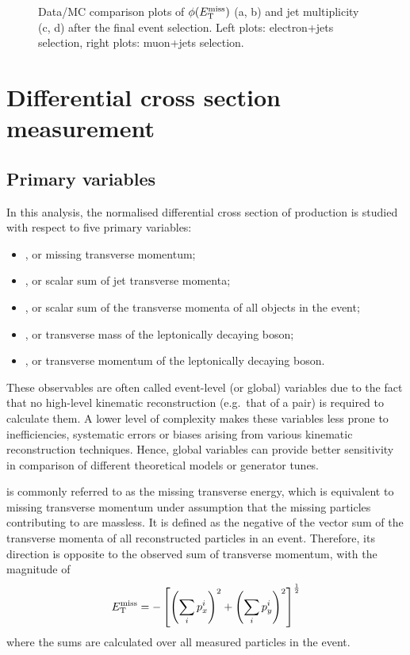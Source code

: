 \begin{figure}[hbtp]
\begin{center}
    \caption{Data/MC comparison plots of $\phi(E_{\mathrm{T}}^{\textrm{miss}})$ (a, b) and jet multiplicity (c, d) after the final event
    selection. Left plots: electron+jets selection, right plots: muon+jets selection.}
    \label{fig:contol_plots_phiMET_NJets}
  \end{center}
\end{figure}

\newpage

\section{Differential cross section measurement}
\label{s_xsection:measurement}

\subsection{Primary variables}
\label{ss_xsection:variables}

In this analysis, the normalised differential cross section of \ttbar production is studied with respect to five primary
variables:

\begin{itemize}
	\item \MET, or missing transverse momentum;
	\item \HT, or scalar sum of jet transverse momenta;
	\item \ST, or scalar sum of the transverse momenta of all objects in the event;
	\item \MT, or transverse mass of the leptonically decaying \W boson;
	\item \WPT, or transverse momentum of the leptonically decaying \W boson.
\end{itemize}

These observables are often called event-level (or global) variables due to the fact that no high-level kinematic
reconstruction (e.g.\ that of a \ttbar pair) is required to calculate them. A lower level of complexity makes these
variables less prone to inefficiencies, systematic errors or biases arising from various kinematic reconstruction
techniques. Hence, global variables can provide better sensitivity in comparison of different theoretical models or
generator tunes.

\MET is commonly referred to as the missing transverse energy, which is equivalent to missing transverse momentum under
assumption that the missing particles contributing to \MET are massless. It is defined as the negative of the vector sum
of the transverse momenta of all reconstructed particles in an event. Therefore, its direction is opposite to the
observed sum of transverse momentum, with the magnitude of
\[ E_{\mathrm{T}}^{\textrm{miss}} = - \left[ \left(\sum_i{p_{x}^i}\right)^2 + \left(\sum_i{p_{y}^i}\right)^2 \right]^{\frac{1}{2}}\]
where the sums are calculated over all measured particles in the event.

